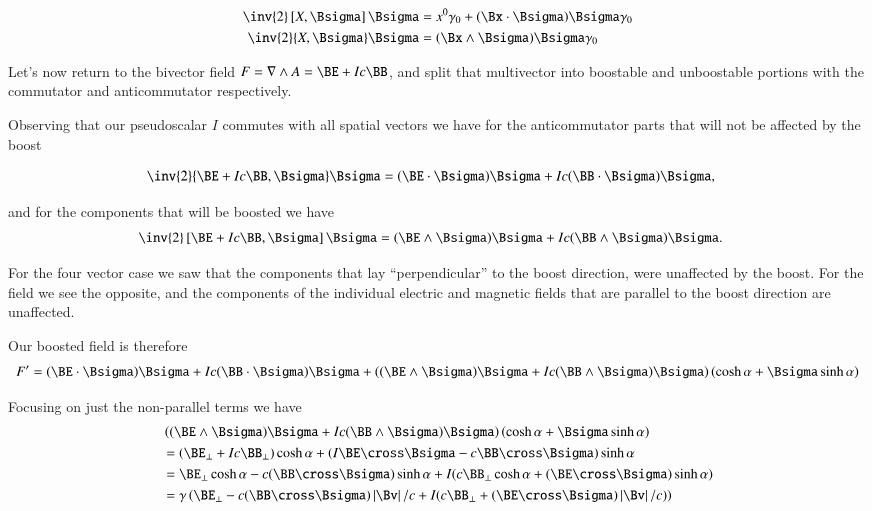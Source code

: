 \begin{align}\label{eqn:boostCommutator:15}
\inv{2} \antisymmetric{X}{\Bsigma} \Bsigma &= x^0 \gamma_0 + (\Bx \cdot \Bsigma) \Bsigma \gamma_0  \\
\inv{2} \symmetric{X}{\Bsigma} \Bsigma &= (\Bx \wedge \Bsigma) \Bsigma \gamma_0 
\end{align}

Let's now return to the bivector field $F = \grad \wedge A = \BE + I c \BB$, and split that multivector into boostable and unboostable portions with the commutator and anticommutator respectively.

Observing that our pseudoscalar $I$ commutes with all spatial vectors we have for the anticommutator parts that will not be affected by the boost

\begin{align}\label{eqn:boostCommutator:20}
\inv{2} \symmetric{\BE + I c \BB}{\Bsigma} \Bsigma &= (\BE \cdot \Bsigma) \Bsigma + I c (\BB \cdot \Bsigma) \Bsigma,
\end{align}

and for the components that will be boosted we have
\begin{align}\label{eqn:boostCommutator:21}
\inv{2} \antisymmetric{\BE + I c \BB}{\Bsigma} \Bsigma &= (\BE \wedge \Bsigma) \Bsigma + I c (\BB \wedge \Bsigma) \Bsigma.
\end{align}

For the four vector case we saw that the components that lay ``perpendicular'' to the boost direction, were unaffected by the boost.  For the field we see the opposite, and the components of the individual electric and magnetic fields that are parallel to the boost direction are unaffected.

Our boosted field is therefore
\begin{align}\label{eqn:boostCommutator:n}
F' = 
(\BE \cdot \Bsigma) \Bsigma + I c (\BB \cdot \Bsigma) \Bsigma
+ 
\left( 
(\BE \wedge \Bsigma) \Bsigma + I c (\BB \wedge \Bsigma) \Bsigma
\right) \left( \cosh \alpha + \Bsigma \sinh \alpha \right)
\end{align}

Focusing on just the non-parallel terms we have
\begin{align*}
&\left( 
(\BE \wedge \Bsigma) \Bsigma + I c (\BB \wedge \Bsigma) \Bsigma
\right) \left( \cosh \alpha + \Bsigma \sinh \alpha \right) \\
&=
(\BE_\perp + I c \BB_\perp ) \cosh\alpha
+(I \BE \cross \Bsigma - c \BB \cross \Bsigma ) \sinh\alpha \\
&=
\BE_\perp \cosh\alpha - c (\BB \cross \Bsigma ) \sinh\alpha 
+ I ( c \BB_\perp \cosh\alpha + (\BE \cross \Bsigma) \sinh\alpha ) \\
&=
\gamma \left(
\BE_\perp - c (\BB \cross \Bsigma ) \Abs{\Bv}/c
+ I ( c \BB_\perp + (\BE \cross \Bsigma) \Abs{\Bv}/c) 
\right)
\end{align*}

